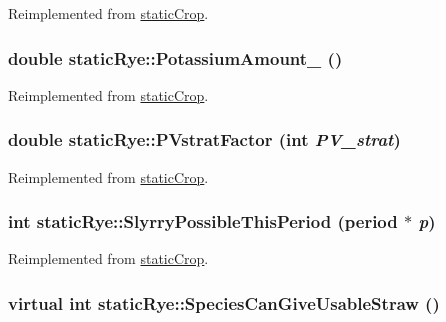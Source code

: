Reimplemented from \hyperlink{classstatic_crop_abaa5c59d4074d47dedc79172f8326e08}{staticCrop}.\hypertarget{classstatic_rye_a48f4563a6399ff40bafcb87e53b2d4a1}{
\subsubsection[{PotassiumAmount\_\-}]{\setlength{\rightskip}{0pt plus 5cm}double staticRye::PotassiumAmount\_\- ()}}
\label{classstatic_rye_a48f4563a6399ff40bafcb87e53b2d4a1}


Reimplemented from \hyperlink{classstatic_crop_a41fee98d728c7670e6acb504a9b3459d}{staticCrop}.\hypertarget{classstatic_rye_a2a8f5a4738e856f635722ea48bf1ea04}{
\subsubsection[{PVstratFactor}]{\setlength{\rightskip}{0pt plus 5cm}double staticRye::PVstratFactor (int {\em PV\_\-strat})}}
\label{classstatic_rye_a2a8f5a4738e856f635722ea48bf1ea04}


Reimplemented from \hyperlink{classstatic_crop_ae4f07498c1616eab212386faf352d348}{staticCrop}.\hypertarget{classstatic_rye_a8e23a3afa6cba94afd57049287748c99}{
\subsubsection[{SlyrryPossibleThisPeriod}]{\setlength{\rightskip}{0pt plus 5cm}int staticRye::SlyrryPossibleThisPeriod ({\bf period} $\ast$ {\em p})}}
\label{classstatic_rye_a8e23a3afa6cba94afd57049287748c99}


Reimplemented from \hyperlink{classstatic_crop_ada7c8c797de629277a5ba0b0a4a3c17e}{staticCrop}.\hypertarget{classstatic_rye_ad0e64c4bdab814efbe44b1ffbaf9a322}{
\subsubsection[{SpeciesCanGiveUsableStraw}]{\setlength{\rightskip}{0pt plus 5cm}virtual int staticRye::SpeciesCanGiveUsableStraw ()}}
\label{classstatic_rye_ad0e64c4bdab814efbe44b1ffbaf9a322}


